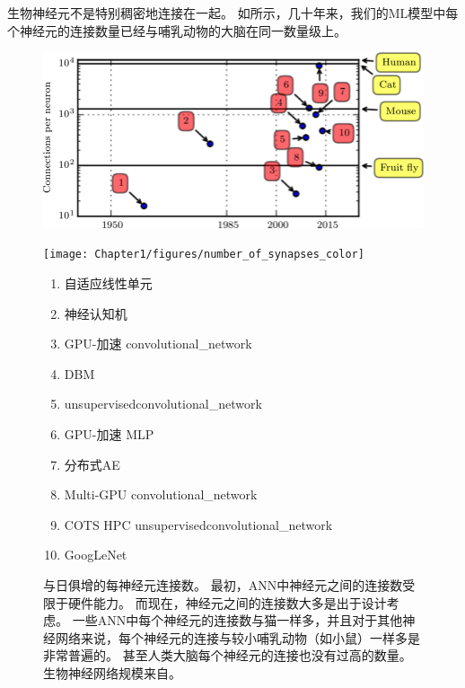 生物神经元不是特别稠密地连接在一起。
如所示，几十年来，我们的\gls{ML}模型中每个神经元的连接数量已经与哺乳动物的大脑在同一数量级上。

\begin{figure}[!htb]
\ifOpenSource
\centerline{\includegraphics[scale=0.5]{images/10.png}}
\else
\centerline{\texttt{[image: Chapter1/figures/number\_of\_synapses\_color]}}
\fi
\caption{与日俱增的每神经元连接数。 %
最初，\gls{ANN}中神经元之间的连接数受限于硬件能力。
而现在，神经元之间的连接数大多是出于设计考虑。
一些\gls{ANN}中每个神经元的连接数与猫一样多，并且对于其他神经网络来说，每个神经元的连接与较小哺乳动物（如小鼠）一样多是非常普遍的。
甚至人类大脑每个神经元的连接也没有过高的数量。
生物神经网络规模来自\citet{number_of_neurons}。
}
\label{fig:chap1_number_of_synapses_color}
{\tiny
\begin{enumerate}
  \itemsep0em
  \item %
    自适应线性单元~\citep{Widrow60}
  \item %
    神经认知机~\citep{Fukushima80}
  \item %
    GPU-加速 \gls{convolutional_network}~\citep{chellapilla:inria-00112631}
  \item %
    \gls{DBM}~\citep{SalHinton09}
  \item %
    \gls{unsupervised}\gls{convolutional_network}~\citep{Jarrett-ICCV2009-small}
  \item %
    GPU-加速 \gls{MLP}~\citep{Ciresan-2010}
  \item %
    分布式\gls{AE}~\citep{QuocLe-ICML2012}
  \item %
    Multi-GPU \gls{convolutional_network}~\citep{Krizhevsky-2012-small}
  \item %
    COTS HPC  \gls{unsupervised}\gls{convolutional_network}~\citep{icml2013_coates13}
  \item %
    GoogLeNet~\citep{Szegedy-et-al-arxiv2014}
\end{enumerate}
} %
\end{figure}

